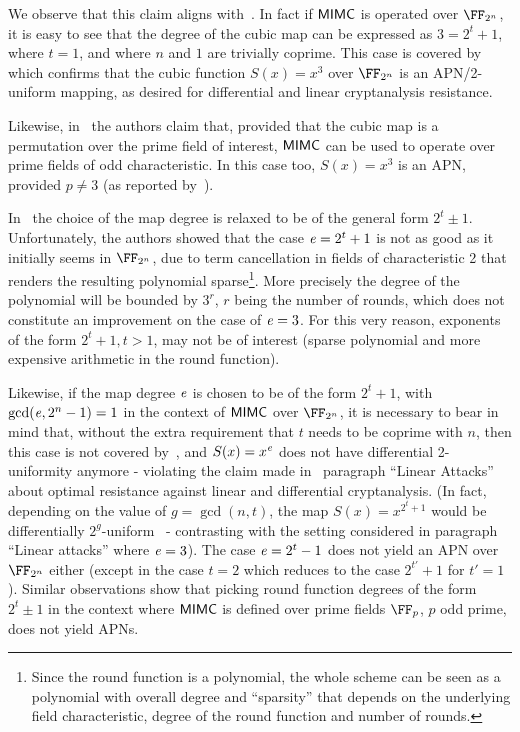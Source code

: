 We observe that this claim aligns with~\cite[Theorem 2]{DBLP:journals/tit/HellesethRS99}. In fact if $\mathsf{MIMC{}}$ is operated over $\FFx{2^n}$, it is easy to see that the degree of the cubic map can be expressed as $3 = 2^t + 1$, where $t = 1$, and where $n$ and $1$ are trivially coprime. This case is covered by~\cite[Theorem 2]{DBLP:journals/tit/HellesethRS99} which confirms that the cubic function $S(x) = x^3$ over $\FFx{2^n}$ is an APN/2-uniform mapping, as desired for differential and linear cryptanalysis resistance.

Likewise, in~\cite[Section 5.1]{albrecht2016mimc} the authors claim that, provided that the cubic map is a permutation over the prime field of interest, $\mathsf{MIMC{}}$ can be used to operate over prime fields of odd characteristic. In this case too, $S(x) = x^3$ is an APN, provided $p \neq 3$ (as reported by~\cite[Theorem 3, item 3]{DBLP:journals/tit/HellesethRS99}).

In~\cite[Section 5.3]{albrecht2016mimc} the choice of the map degree is relaxed to be of the general form $2^t \pm 1$. Unfortunately, the authors showed that the case $\mathit{e}{} = 2^t + 1$ is not as good as it initially seems in $\FFx{2^n}$, due to term cancellation in fields of characteristic 2 that renders the resulting polynomial sparse\footnote{Since the round function is a polynomial, the whole scheme can be seen as a polynomial with overall degree and ``sparsity'' that depends on the underlying field characteristic, degree of the round function and number of rounds.}. More precisely the degree of the polynomial will be bounded by $3^r$, $r$ being the number of rounds, which does not constitute an improvement on the case of $\mathit{e}{} = 3$. For this very reason, exponents of the form $2^t + 1, t > 1$, may not be of interest (sparse polynomial and more expensive arithmetic in the round function).

Likewise, if the map degree $\mathit{e}{}$ is chosen to be of the form $2^t + 1$, with $\gcd(\mathit{e}{}, 2^n - 1) = 1$ in the context of $\mathsf{MIMC{}}$ over $\FFx{2^n}$, it is necessary to bear in mind that, without the extra requirement that $t$ needs to be coprime with $n$, then this case is not covered by~\cite[Theorem 2]{DBLP:journals/tit/HellesethRS99}, and $S(x) = x^{\mathit{e}}{}$ does not have differential 2-uniformity anymore - violating the claim made in~\cite[Section 4.2]{albrecht2016mimc} paragraph ``Linear Attacks'' about optimal resistance against linear and differential cryptanalysis. (In fact, depending on the value of $g = \gcd(n, t)$, the map $S(x) = x^{2^t + 1}$ would be differentially $2^g$-uniform~\cite{DBLP:conf/eurocrypt/Nyberg93} - contrasting with the setting considered in paragraph ``Linear attacks'' where $\mathit{e}{} = 3$).
The case $\mathit{e}{} = 2^t - 1$ does not yield an APN over $\FFx{2^n}$ either (except in the case $t = 2$ which reduces to the case $2^{t'} + 1$ for $t' = 1$). Similar observations show that picking round function degrees of the form $2^t \pm 1$ in the context where $\mathsf{MIMC{}}$ is defined over prime fields $\FFx{p}$, $p$ odd prime, does not yield APNs.

